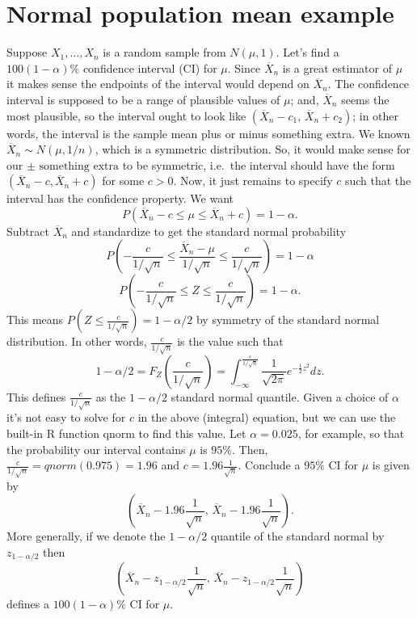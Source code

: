 \documentclass[
]{book}
\begin{document}
\hypertarget{normal-population-mean-example}{%
\section{Normal population mean example}\label{normal-population-mean-example}}

Suppose \(X_1, \ldots, X_n\) is a random sample from \(N(\mu, 1)\). Let's find a \(100(1-\alpha)\%\) confidence interval (CI) for \(\mu\). Since \(\overline X_n\) is a great estimator of \(\mu\) it makes sense the endpoints of the interval would depend on \(\overline X_n\). The confidence interval is supposed to be a range of plausible values of \(\mu\); and, \(\overline X_n\) seems the most plausible, so the interval ought to look like \((\overline X_n - c_1, \, \overline X_n + c_2)\); in other words, the interval is the sample mean plus or minus something extra. We known \(\overline X_n \sim N(\mu, 1/n)\), which is a symmetric distribution. So, it would make sense for our \(\pm \text{ something extra}\) to be symmetric, i.e.~the interval should have the form \((\overline X_n - c, \overline X_n + c)\) for some \(c>0\). Now, it just remains to specify \(c\) such that the interval has the confidence property. We want
\[P(\overline X_n - c \leq \mu \leq \overline X_n +c) = 1-\alpha.\]
Subtract \(\overline X_n\) and standardize to get the standard normal probability
\[P\left(-\frac{c}{1/\sqrt{n}} \leq \frac{\overline X_n - \mu}{1/\sqrt{n}} \leq \frac{c}{1/\sqrt{n}}\right) = 1-\alpha\]
\[P\left(-\frac{c}{1/\sqrt{n}} \leq Z \leq \frac{c}{1/\sqrt{n}}\right) = 1-\alpha.\]
This means \(P(Z\leq \frac{c}{1/\sqrt{n}}) = 1-\alpha/2\) by symmetry of the standard normal distribution. In other words, \(\frac{c}{1/\sqrt{n}}\) is the value such that
\[1-\alpha/2=F_Z(\frac{c}{1/\sqrt{n}})=\int_{-\infty}^{\frac{c}{1/\sqrt{n}}} \frac{1}{\sqrt{2\pi}}e^{-\frac{1}{2}z^2}dz.\]
This defines \(\frac{c}{1/\sqrt{n}}\) as the \(1-\alpha/2\) standard normal quantile. Given a choice of \(\alpha\) it's not easy to solve for \(c\) in the above (integral) equation, but we can use the built-in R function qnorm to find this value. Let \(\alpha = 0.025\), for example, so that the probability our interval contains \(\mu\) is \(95\%\). Then, \(\frac{c}{1/\sqrt{n}} = qnorm(0.975) = 1.96\) and \(c = 1.96\frac{1}{\sqrt{n}}\). Conclude a \(95\%\) CI for \(\mu\) is given by
\[\left(\overline X_n - 1.96\frac{1}{\sqrt{n}}, \,\overline X_n - 1.96\frac{1}{\sqrt{n}}\right).\]
More generally, if we denote the \(1-\alpha/2\) quantile of the standard normal by \(z_{1-\alpha/2}\) then
\[\left(\overline X_n - z_{1-\alpha/2}\frac{1}{\sqrt{n}}, \,\overline X_n - z_{1-\alpha/2}\frac{1}{\sqrt{n}}\right)\]
defines a \(100(1-\alpha)\%\) CI for \(\mu\).
\end{document}
